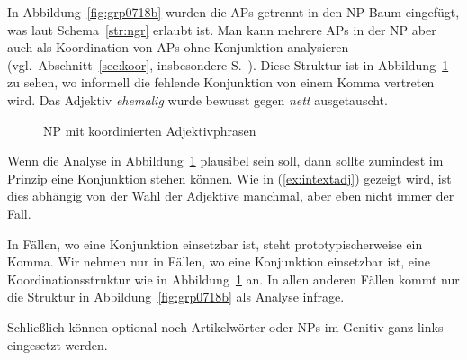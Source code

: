 In Abbildung~\ref{fig:grp0718b} wurden die APs getrennt in den NP-Baum eingefügt, was laut Schema~\ref{str:ngr} erlaubt ist.
Man kann mehrere APs in der NP aber auch als Koordination von APs ohne Konjunktion analysieren (vgl.\ Abschnitt~\ref{sec:koor}, insbesondere S.~\pageref{abs:koorohnekonj}).
Diese Struktur ist in Abbildung~\ref{fig:ngradjkonj} zu sehen, wo informell die fehlende Konjunktion von einem Komma vertreten wird.
Das Adjektiv \textit{ehemalig} wurde bewusst gegen \textit{nett} ausgetauscht.

\begin{figure}[!htbp]
  \centering
  \caption{NP mit koordinierten Adjektivphrasen}
  \label{fig:ngradjkonj}
\end{figure}

Wenn die Analyse in Abbildung~\ref{fig:ngradjkonj} plausibel sein soll, dann sollte zumindest im Prinzip eine Konjunktion stehen können.
Wie in (\ref{ex:intextadj}) gezeigt wird, ist dies abhängig von der Wahl der Adjektive manchmal, aber eben nicht immer der Fall.

\begin{exe}
  \ex\label{ex:intextadj}
  \begin{xlist}
  \end{xlist}
\end{exe}

In Fällen, wo eine Konjunktion einsetzbar ist, steht prototypischerweise ein Komma.
Wir nehmen nur in Fällen, wo eine Konjunktion einsetzbar ist, eine Koordinationsstruktur wie in Abbildung~\ref{fig:ngradjkonj} an.
In allen anderen Fällen kommt nur die Struktur in Abbildung~\ref{fig:grp0718b} als Analyse infrage.

Schließlich können optional noch Artikelwörter oder NPs im Genitiv ganz links eingesetzt werden.

\begin{exe}
  \ex\label{ex:grp7000}
  \begin{xlist}
  \end{xlist}
\end{exe}


